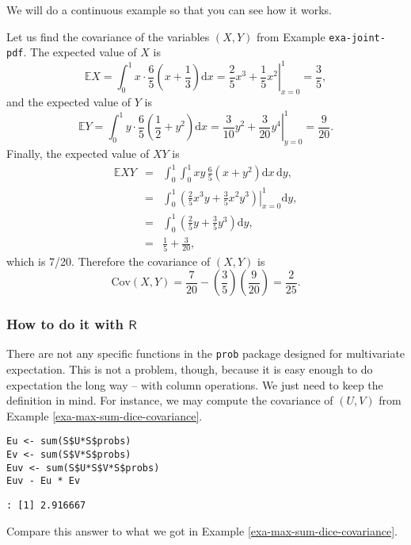 We will do a continuous example so that you can see how it works.



Let us find the covariance of the variables \((X,Y)\) from Example
\texttt{exa-joint-pdf}. The expected value of \(X\) is \[ \mathbb{E}
X=\int_{0}^{1}x\cdot\frac{6}{5}\left(x+\frac{1}{3}\right)\mathrm{d}
x=\left.\frac{2}{5}x^{3}+\frac{1}{5}x^{2}\right|_{x=0}^{1}=\frac{3}{5},
\] and the expected value of \(Y\) is \[ \mathbb{E}
Y=\int_{0}^{1}y\cdot\frac{6}{5}\left(\frac{1}{2}+y^{2}\right)\mathrm{d}
x=\left.\frac{3}{10}y^{2}+\frac{3}{20}y^{4}\right|_{y=0}^{1}=\frac{9}{20}.
\] Finally, the expected value of \(XY\) is
\begin{eqnarray*}
\mathbb{E} XY & = & \int_{0}^{1}\int_{0}^{1}xy\,\frac{6}{5}\left(x+y^{2}\right)\mathrm{d} x\,\mathrm{d} y,\\
 & = & \int_{0}^{1}\left.\left(\frac{2}{5}x^{3}y+\frac{3}{5}x^{2}y^{3}\right)\right|_{x=0}^{1}\mathrm{d} y,\\
 & = & \int_{0}^{1}\left(\frac{2}{5}y+\frac{3}{5}y^{3}\right)\mathrm{d} y,\\
 & = & \frac{1}{5}+\frac{3}{20},
\end{eqnarray*}
which is 7/20. Therefore the covariance of \((X,Y)\) is
\[
\mbox{Cov}(X,Y)=\frac{7}{20}-\left(\frac{3}{5}\right)\left(\frac{9}{20}\right)=\frac{2}{25}.
\]

\subsubsection{How to do it with \(\mathsf{R}\)}
\label{sec-7-2-1-1}

There are not any specific functions in the \texttt{prob} package \cite{prob}
designed for multivariate expectation. This is not a problem, though,
because it is easy enough to do expectation the long way -- with
column operations. We just need to keep the definition in mind. For
instance, we may compute the covariance of \((U,V)\) from Example
\ref{exa-max-sum-dice-covariance}.

\begin{verbatim}
Eu <- sum(S$U*S$probs)
Ev <- sum(S$V*S$probs)
Euv <- sum(S$U*S$V*S$probs)
Euv - Eu * Ev
\end{verbatim}

\begin{verbatim}
: [1] 2.916667
\end{verbatim}

Compare this answer to what we got in Example \ref{exa-max-sum-dice-covariance}.

